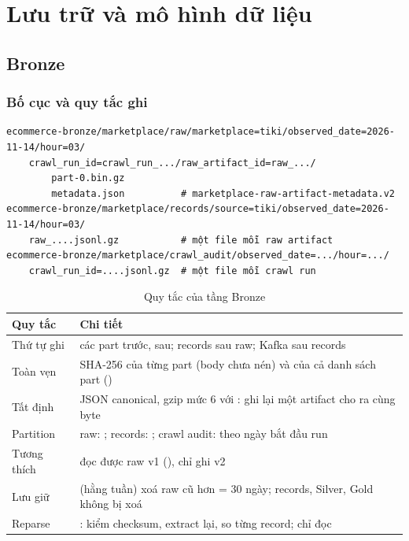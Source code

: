\chapter{Lưu trữ và mô hình dữ liệu}\label{chap:storage}

\section{Bronze}\label{sec:bronze}
\subsection{Bố cục và quy tắc ghi}
\begin{verbatim}
ecommerce-bronze/marketplace/raw/marketplace=tiki/observed_date=2026-11-14/hour=03/
    crawl_run_id=crawl_run_.../raw_artifact_id=raw_.../
        part-0.bin.gz
        metadata.json          # marketplace-raw-artifact-metadata.v2
ecommerce-bronze/marketplace/records/source=tiki/observed_date=2026-11-14/hour=03/
    raw_....jsonl.gz           # một file mỗi raw artifact
ecommerce-bronze/marketplace/crawl_audit/observed_date=.../hour=.../
    crawl_run_id=....jsonl.gz  # một file mỗi crawl run
\end{verbatim}

\begin{xltabular}{\linewidth}{@{}L{30mm}Y@{}}
  \caption{Quy tắc của tầng Bronze}\label{tab:bronze-rules}\\
  \toprule
  \textbf{Quy tắc} & \textbf{Chi tiết} \\
  \midrule
  Thứ tự ghi & các part trước,  sau; records sau raw; Kafka sau records \\
  Toàn vẹn & SHA-256 của từng part (body chưa nén) và của cả danh sách part () \\
  Tất định & JSON canonical, gzip mức 6 với : ghi lại một artifact cho ra cùng byte \\
  Partition & raw: ; records: ; crawl audit: theo ngày bắt đầu run \\
  Tương thích & đọc được raw v1 (), chỉ ghi v2 \\
  Lưu giữ &  (hằng tuần) xoá raw cũ hơn  = 30 ngày; records, Silver, Gold không bị xoá \\
  Reparse & : kiểm checksum, extract lại, so từng record; chỉ đọc \\
  \bottomrule
\end{xltabular}

